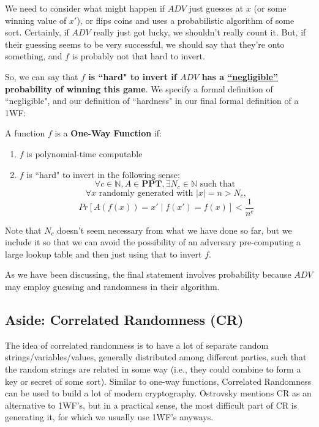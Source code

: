 \documentclass[11pt]{article}
\newcommand{\N}{\mathbb{N}}
\begin{document}
We need to consider what might happen if \(ADV\) just guesses at \(x\) (or some winning value of \(x'\)), or flips coins and uses a probabilistic algorithm of some sort. Certainly, if \(ADV\) really just got lucky, we shouldn't really count it. But, if their guessing seems to be very successful, we should say that they're onto something, and \(f\) is probably not that hard to invert. 

So, we can say that \textbf{ \(f\) is ``hard" to invert if \(ADV\) has a \underline{``negligible''} probability of winning this game}. We specify a formal definition of ``negligible", and our definition of ``hardness" in our final formal definition of a 1WF:\medskip

A function \(f\) is a \textbf{One-Way Function} if:

\begin{enumerate}
\item \(f\) is polynomial-time computable
\item \(f\) is ``hard" to invert in the following sense:
\[\forall c\in\N, A\in\mathbf{PPT}, \exists N_c\in\N\text{ such that }\]
\[\forall x\text{ randomly generated with }|x|=n>N_c,\]
\[Pr[A(f(x))=x'\mid f(x')=f(x)]<\frac{1}{n^c}\]
\end{enumerate}

Note that \(N_c\) doesn't seem necessary from what we have done so far, but we include it so that we can avoid the possibility of an adversary pre-computing a large lookup table and then just using that to invert \(f\). 

As we have been discussing, the final statement involves probability because \(ADV\) may employ guessing and randomness in their algorithm.


\subsection{Aside: Correlated Randomness (CR)}

The idea of correlated randomness is to have a lot of separate random strings/variables/values, generally distributed among different parties, such that the random strings are related in some way (i.e., they could combine to form a key or secret of some sort). Similar to one-way functions, Correlated Randomness can be used to build a lot of modern cryptography. Ostrovsky mentions CR as an alternative to 1WF's, but in a practical sense, the most difficult part of CR is generating it, for which we usually use 1WF's anyways. \smallskip
\end{document}
